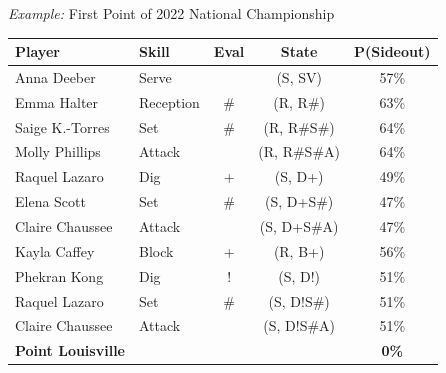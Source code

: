 \documentclass[handout]{beamer}
\begin{document}
\begin{frame}{{\it Example:} First Point of 2022 National Championship}
  \centering
  \begin{tabular}{llc|cc}
    \bf Player                      & \bf Skill                 & \bf Eval            & \bf State                   & \bf P(Sideout)\\
    \hline
    \color{red} Anna Deeber         & \color{red} Serve         &                     & \color{red} (S, SV)         & \color{orange} 57\%\\
    \color{orange} Emma Halter      & \color{orange} Reception  & \color{orange} \#   & \color{orange} (R, R\#)     & \color{orange} 63\%\\
    \color{orange} Saige K.-Torres  & \color{orange} Set        & \color{orange} \#   & \color{orange} (R, R\#S\#)  & \color{orange} 64\%\\
    \color{orange} Molly Phillips   & \color{orange} Attack     &                     & \color{orange} (R, R\#S\#A) & \color{orange} 64\%\\
    \color{red} Raquel Lazaro       & \color{red} Dig           & \color{red} +       & \color{red} (S, D+)         & \color{orange} 49\%\\
    \color{red} Elena Scott         & \color{red} Set           & \color{red} \#      & \color{red} (S, D+S\#)      & \color{orange} 47\%\\
    \color{red} Claire Chaussee     & \color{red} Attack        &                     & \color{red} (S, D+S\#A)     & \color{orange} 47\%\\
    \color{orange} Kayla Caffey     & \color{orange} Block      & \color{orange} +    & \color{orange} (R, B+)      & \color{orange} 56\%\\
    \color{red} Phekran Kong        & \color{red} Dig           & \color{red} !       & \color{red} (S, D!)         & \color{orange} 51\%\\
    \color{red} Raquel Lazaro       & \color{red} Set           & \color{red} \#      & \color{red} (S, D!S\#)      & \color{orange} 51\%\\
    \color{red} Claire Chaussee     & \color{red} Attack        &                     & \color{red} (S, D!S\#A)     & \color{orange} 51\%\\
    \hline
    \bf\color{red} Point Louisville &                           &                     &                             & \color{orange} \bf 0\%\\
  \end{tabular}
\end{frame}
\end{document}
